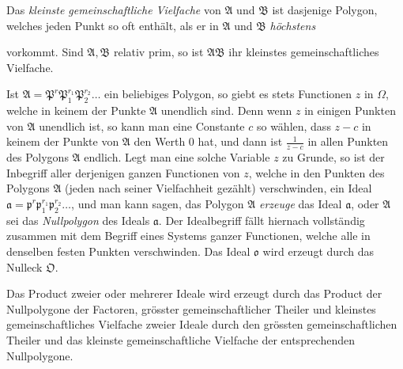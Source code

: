 \documentclass{article}
\begin{document}
Das \emph{kleinste gemeinschaftliche Vielfache} von $\mathfrak{A}$ und $\mathfrak{B}$ ist dasjenige Polygon, welches jeden Punkt so oft enthält, als er in $\mathfrak{A}$ und $\mathfrak{B}$ \emph{höchstens}

vorkommt. Sind $\mathfrak{A}, \mathfrak{B}$ relativ prim, so ist $\mathfrak{A}\mathfrak{B}$ ihr kleinstes gemeinschaftliches Vielfache.

Ist $\mathfrak{A} = \mathfrak{P}^{r}\mathfrak{P}_{1}^{r_{1}}\mathfrak{P}_{2}^{r_{2}}\ldots$ ein beliebiges Polygon, so giebt es stets Functionen $z$ in $\Omega$, welche in keinem der Punkte $\mathfrak{A}$ unendlich sind. Denn wenn $z$ in einigen Punkten von $\mathfrak{A}$ unendlich ist, so kann man eine Constante $c$ so wählen, dass $z-c$ in keinem der Punkte von $\mathfrak{A}$ den Werth 0 hat, und dann ist $\frac{1}{z-c}$ in allen Punkten des Polygons $\mathfrak{A}$ endlich. Legt man eine solche Variable $z$ zu Grunde, so ist der Inbegriff aller derjenigen ganzen Functionen von $z$, welche in den Punkten des Polygons $\mathfrak{A}$ (jeden nach seiner Vielfachheit gezählt) verschwinden, ein Ideal $\mathfrak{a} = \mathfrak{p}^{r}\mathfrak{p}_{1}^{r_{1}}\mathfrak{p}_{2}^{r_{2}}\ldots$, und man kann sagen, das Polygon $\mathfrak{A}$ \emph{erzeuge} das Ideal $\mathfrak{a}$, oder $\mathfrak{A}$ sei das \emph{Nullpolygon} des Ideals $\mathfrak{a}$. Der Idealbegriff fällt hiernach vollständig zusammen mit dem Begriff eines Systems ganzer Functionen, welche alle in denselben festen Punkten verschwinden. Das Ideal $\mathfrak{o}$ wird erzeugt durch das Nulleck $\mathfrak{O}$.

Das Product zweier oder mehrerer Ideale wird erzeugt durch das Product der Nullpolygone der Factoren, grösster gemeinschaftlicher Theiler und kleinstes gemeinschaftliches Vielfache zweier Ideale durch den grössten gemeinschaftlichen Theiler und das kleinste gemeinschaftliche Vielfache der entsprechenden Nullpolygone.
\end{document}
